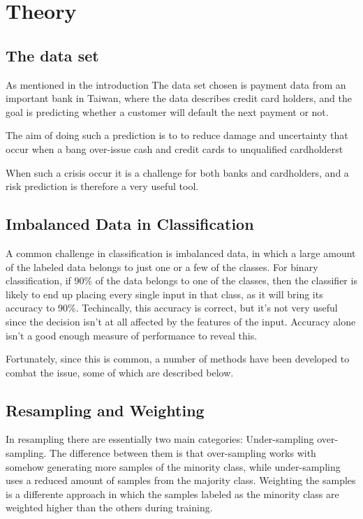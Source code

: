 \section{Theory}
\subsection{The data set}
As mentioned in the introduction The data set chosen is payment data 
from an important bank in Taiwan, where the data describes credit card holders,
and the goal is predicting whether a customer will default the next 
payment or not.

The aim of doing such a prediction is to to reduce damage and 
uncertainty that occur when a bang over-issue cash and credit 
cards to unqualified cardholderst ~\cite{ComparisonData}

When such a crisis occur it is a challenge for both banks and 
cardholders, and a risk prediction is therefore a very useful tool. 


\subsection{Imbalanced Data in Classification}
A common challenge in classification is imbalanced data, in which a large
amount of the labeled data belongs to just one or a few of the classes.
For binary classification, if 90\% of the data belongs to one of the classes,
then the classifier is likely to end up placing every single
input in that class, as it will bring its accuracy to 90\%. Techincally, this
accuracy is correct, but it's not very useful since the decision isn't at all
affected by the features of the input. Accuracy alone isn't a good enough
measure of performance to reveal this.

Fortunately, since this is common, a number of methods have been developed
to combat the issue, some of which are described below.

\subsection{Resampling and Weighting}
In resampling there are essentially two main categories: Under-sampling
over-sampling. The difference between them is that over-sampling works with
somehow generating more samples of the minority class, while under-sampling
uses a reduced amount of samples from the majority class.
Weighting the samples is a differente approach in which the samples labeled
as the minority class are weighted higher than the others during training.


